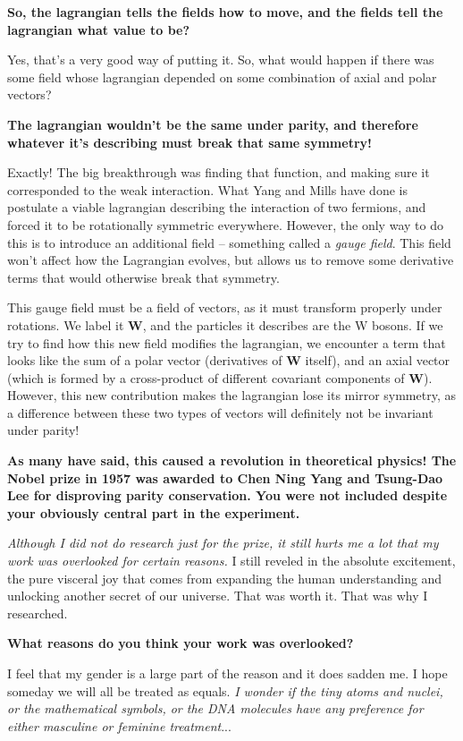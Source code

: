 \documentclass{article}
\newcommand{\q}[1]{\vspace{10pt}
\textbf{#1}}
\begin{document}
\begin{multicols}{2}
\q{So, the lagrangian tells the fields how to move, and the fields tell the lagrangian what value to be?}

Yes, that’s a very good way of putting it. So, what would happen if there was some field whose lagrangian depended on some combination of axial and polar vectors?

\q{The lagrangian wouldn’t be the same under parity, and therefore whatever it’s describing must break that same symmetry!}

Exactly! The big breakthrough was finding that function, and making sure it corresponded to the weak interaction. What Yang and Mills have done is postulate a viable lagrangian describing the interaction of two fermions, and forced it to be rotationally symmetric everywhere. However, the only way to do this is to introduce an additional field – something called a \textit{gauge field}. This field won’t affect how the Lagrangian evolves, but allows us to remove some derivative terms that would otherwise break that symmetry.

This gauge field must be a field of vectors, as it must transform properly under rotations. We label it \textbf{W}, and the particles it describes are the W bosons. If we try to find how this new field modifies the lagrangian, we encounter a term that looks like the sum of a polar vector (derivatives of \textbf{W} itself), and an axial vector (which is formed by a cross-product of different covariant components of \textbf{W})\cite{J1}. However, this new contribution makes the lagrangian lose its mirror symmetry, as a difference between these two types of vectors will definitely not be invariant under parity!

\q{As many have said, this caused a revolution in theoretical physics! The Nobel prize in 1957 was awarded to Chen Ning Yang and Tsung-Dao Lee for disproving parity conservation\cite{N8}. You were not included despite your obviously central part in the experiment.}

\textit{Although I did not do research just for the prize, it still hurts me a lot that my work was overlooked for certain reasons.} I still reveled in the absolute excitement, the pure visceral joy that comes from expanding the human understanding and unlocking another secret of our universe. That was worth it. That was why I researched.

\vspace{10pt}
\q{What reasons do you think your work was overlooked?}

I feel that my gender is a large part of the reason and it does sadden me\cite{N15}. I hope someday we will all be treated as equals. \textit{I wonder if the tiny atoms and nuclei, or the mathematical symbols, or the DNA molecules have any preference for either masculine or feminine treatment}\cite{N9}...


\end{multicols}
\end{document}
